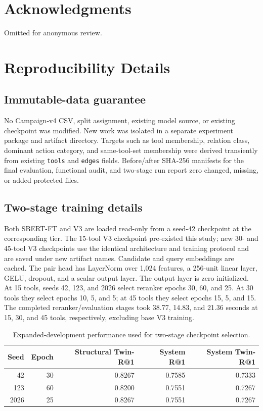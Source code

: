 \documentclass{article}
\newcommand{\sbert}{\textsc{SBERT-FT}}
\begin{document}
\section*{Acknowledgments}
Omitted for anonymous review.




\appendix

\section{Reproducibility Details}

\subsection{Immutable-data guarantee}

No Campaign-v4 CSV, split assignment, existing model source, or existing checkpoint was modified.
New work was isolated in a separate experiment package and artifact directory.
Targets such as tool membership, relation class, dominant action category, and same-tool-set membership were derived transiently from existing \texttt{tools} and \texttt{edges} fields.
Before/after SHA-256 manifests for the final evaluation, functional audit, and two-stage run report zero changed, missing, or added protected files.

\subsection{Two-stage training details}

Both \sbert{} and V3 are loaded read-only from a seed-42 checkpoint at the corresponding tier.
The 15-tool V3 checkpoint pre-existed this study; new 30- and 45-tool V3 checkpoints use the identical architecture and training protocol and are saved under new artifact names.
Candidate and query embeddings are cached.
The pair head has LayerNorm over 1,024 features, a 256-unit linear layer, GELU, dropout, and a scalar output layer.
The output layer is zero initialized.
At 15 tools, seeds 42, 123, and 2026 select reranker epochs 30, 60, and 25.
At 30 tools they select epochs 10, 5, and 5; at 45 tools they select epochs 15, 5, and 15.
The completed reranker/evaluation stages took 38.77, 14.83, and 21.36 seconds at 15, 30, and 45 tools, respectively, excluding base V3 training.

\begin{table}[h]
\caption{Expanded-development performance used for two-stage checkpoint selection.}
\centering
\small
\begin{tabular}{rrrrr}
\toprule
Seed & Epoch & Structural Twin-R@1 & System R@1 & System Twin-R@1 \\
\midrule
42 & 30 & 0.8267 & 0.7585 & 0.7333 \\
123 & 60 & 0.8200 & 0.7551 & 0.7267 \\
2026 & 25 & 0.8267 & 0.7551 & 0.7267 \\
\bottomrule
\end{tabular}
\end{table}
\end{document}
